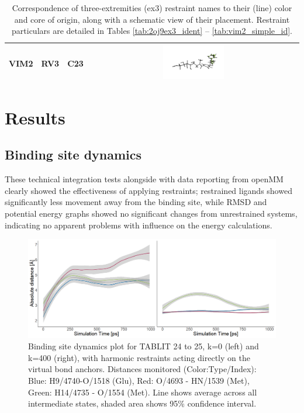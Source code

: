 \documentclass[oneside]{scrreprt}
\begin{document}
\begin{table}[]
{\begin{tabular}[t]{|l|l|l|c|}
\multirow{-3}{*}{\textbf{VIM2}} & {\color[HTML]{94C154} \textbf{RV3}} & {\color[HTML]{94C154} \textbf{C23}} &                  \includegraphics[width=0.3\textwidth]{ex3vis/RV03.png}                 \\ \hline
\end{tabular}%
}
\caption{Correspondence of three-extremities (ex3) restraint names to their (line) color and core of origin, along with a schematic view of their placement. Restraint particulars are detailed in Tables \ref{tab:2oj9ex3_ident} -- \ref{tab:vim2_simple_id}.}
\label{tab:overview_restraintnames}
\end{table}



\chapter{Results}
\section{Binding site dynamics}\label{sec:results_bsdynamics}
These technical integration tests alongside with data reporting from openMM clearly showed the effectiveness of applying restraints; restrained ligands showed significantly less movement away from the binding site, while RMSD and potential energy graphs showed no significant changes from unrestrained systems, indicating no apparent problems with influence on the energy calculations.
\begin{figure}[H]
\includegraphics[width=1\textwidth]{plots/bsplotcombi.png}

\caption[Binding site dynamics plot: TABLIT 24 to 25, k=0 and k=400]{Binding site dynamics plot for TABLIT  24 to 25, k=0 (left) and k=400 (right), with harmonic restraints acting directly on the virtual bond anchors. Distances monitored (Color:Type/Index): Blue: H9/4740-O/1518 (Glu), Red: O/4693 - HN/1539 (Met), Green: H14/4735 - O/1554 (Met). Line shows average across all intermediate states, shaded area shows 95\% confidence interval.}

\label{fig:bsplotcombi}
\end{figure}
\end{document}

